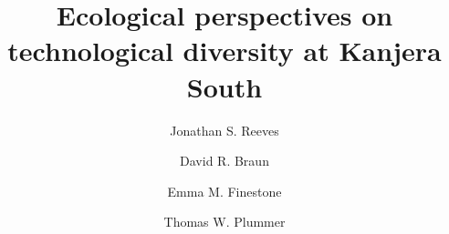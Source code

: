 \documentclass[]{elsarticle} %
\begin{document}
\begin{frontmatter}

  \title{Ecological perspectives on technological diversity at Kanjera South}
    \author[Department of Prehistory and Quarternary Ecology, Eberhard Karls
University of Tübingen]{Jonathan S. Reeves}
    \author[Center for the Advanced Study of Human Paleobiology, The George
Washington University]{David R. Braun}
    \author[Department of Archaeology, Max Planck Institute for the Science of Human
History]{Emma M. Finestone}
    \author[Department of Anthropology, Queens College]{Thomas W. Plummer}
      \address[Department of Prehistory and Quarternary Ecology]{Eberhard Karls University of Tübingen, Schloss Hohentübingen Burgsteige
11, 72070 Tübingen, Germany}
    \address[Center for the Advanced Study of Human Paleobiology]{George Washington University, 800 22nd Street, North West, Washington
D.C., USA.}
    \address[Department of Archaeology]{Max Planck Institute for the Science of Human History, Kahlaische
Strasse 10, D-07743, Jena, Germany}
    \address[Department of Anthropology, Queens College]{CUNY \& NYCEP, 65-30 Kissena Blvd, Flushing, NY 11367, USA}
  

\end{frontmatter}
\end{document}
